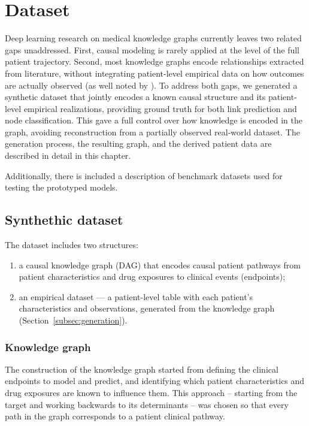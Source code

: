 \newpage %
\section{Dataset}

Deep learning research on medical knowledge graphs currently leaves two related
 gaps unaddressed. First, causal modeling is rarely applied at the level of 
 the full patient trajectory.
 Second, most knowledge graphs encode relationships extracted from literature, 
 without integrating patient-level empirical data on how outcomes are actually 
 observed (as well noted by \textcite{toonsi2025causal}). 
 To address both gaps, we generated a synthetic dataset that jointly 
 encodes a known causal structure and its patient-level empirical realizations, 
 providing ground truth for both link prediction and node classification. 
 This gave a full control over how knowledge is encoded in the graph, 
 avoiding reconstruction from a partially observed real-world dataset.
 The generation process, the resulting graph, and the derived patient data are 
 described in detail in this chapter. 
 
 Additionally, there is included 
 a description of benchmark datasets used for testing the prototyped models.

\subsection{Synthethic dataset}

The dataset includes two structures:

\begin{enumerate}
    \item a causal knowledge graph (DAG) that encodes causal patient pathways
    from patient characteristics and drug exposures to clinical events
    (endpoints);
    \item an empirical dataset --- a patient-level table with each patient's
    characteristics and observations, generated from the knowledge graph
    (Section~\ref{subsec:generation}).
\end{enumerate}

\subsubsection{Knowledge graph}

The construction of the knowledge graph started from defining the clinical
endpoints to model and predict, and identifying which patient
characteristics and drug exposures are known to influence them. This
approach -- starting from the target and working backwards to its
determinants -- was chosen so that every path in the graph corresponds to a
patient clinical pathway.


